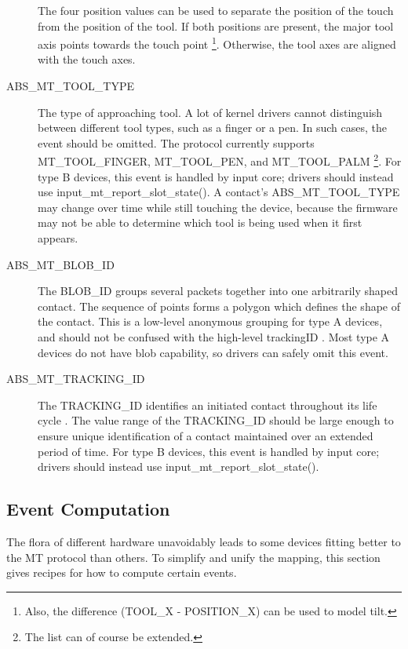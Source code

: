 \documentclass[a4paper,8pt,english]{sphinxmanual}
\begin{document}
\begin{description}
The four position values can be used to separate the position of the touch
from the position of the tool. If both positions are present, the major
tool axis points towards the touch point \footnote[1]{
Also, the difference (TOOL\_X - POSITION\_X) can be used to model tilt.
}. Otherwise, the tool axes are
aligned with the touch axes.

\item[{ABS\_MT\_TOOL\_TYPE}] \leavevmode
The type of approaching tool. A lot of kernel drivers cannot distinguish
between different tool types, such as a finger or a pen. In such cases, the
event should be omitted. The protocol currently supports MT\_TOOL\_FINGER,
MT\_TOOL\_PEN, and MT\_TOOL\_PALM \footnote[2]{
The list can of course be extended.
}. For type B devices, this event is
handled by input core; drivers should instead use
input\_mt\_report\_slot\_state(). A contact's ABS\_MT\_TOOL\_TYPE may change over
time while still touching the device, because the firmware may not be able
to determine which tool is being used when it first appears.

\item[{ABS\_MT\_BLOB\_ID}] \leavevmode
The BLOB\_ID groups several packets together into one arbitrarily shaped
contact. The sequence of points forms a polygon which defines the shape of
the contact. This is a low-level anonymous grouping for type A devices, and
should not be confused with the high-level trackingID \footnotemark[5]. Most type A
devices do not have blob capability, so drivers can safely omit this event.

\item[{ABS\_MT\_TRACKING\_ID}] \leavevmode
The TRACKING\_ID identifies an initiated contact throughout its life cycle
\footnotemark[5]. The value range of the TRACKING\_ID should be large enough to ensure
unique identification of a contact maintained over an extended period of
time. For type B devices, this event is handled by input core; drivers
should instead use input\_mt\_report\_slot\_state().

\end{description}


\subsection{Event Computation}
\label{input/multi-touch-protocol:event-computation}
The flora of different hardware unavoidably leads to some devices fitting
better to the MT protocol than others. To simplify and unify the mapping,
this section gives recipes for how to compute certain events.
\end{document}
